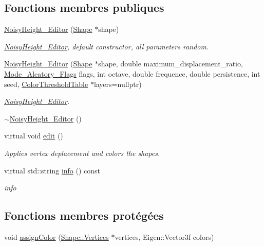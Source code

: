 \subsection*{Fonctions membres publiques}
\begin{DoxyCompactItemize}
\item 
\hyperlink{class_noisy_height___editor_ae4535fb17b29bd29d09dcadd5b9384e3}{Noisy\+Height\+\_\+\+Editor} (\hyperlink{class_shape}{Shape} $\ast$shape)
\begin{DoxyCompactList}\small\item\em \hyperlink{class_noisy_height___editor}{Noisy\+Height\+\_\+\+Editor}, default constructor, all parameters random. \end{DoxyCompactList}\item 
\hyperlink{class_noisy_height___editor_ac56426a50e5adf94c8b2a4211d0b0c77}{Noisy\+Height\+\_\+\+Editor} (\hyperlink{class_shape}{Shape} $\ast$shape, double maximum\+\_\+displacement\+\_\+ratio, \hyperlink{aleatorymode_8h_a8dc9582d5186e7d1ba17c0f21779d3d6}{Mode\+\_\+\+Aleatory\+\_\+\+Flags} flags, int octave, double frequence, double persistence, int seed, \hyperlink{thresholdtable_8h_ab0deb49d07758f9814993774cb9935cc}{Color\+Threshold\+Table} $\ast$layers=nullptr)
\begin{DoxyCompactList}\small\item\em \hyperlink{class_noisy_height___editor}{Noisy\+Height\+\_\+\+Editor}. \end{DoxyCompactList}\item 
\hyperlink{class_noisy_height___editor_afd295143a12d4d63773f69c1b5d1318b}{$\sim$\+Noisy\+Height\+\_\+\+Editor} ()
\item 
virtual void \hyperlink{class_noisy_height___editor_a3ed5c7267dec56ff2f21366ce2ae9818}{edit} ()
\begin{DoxyCompactList}\small\item\em Applies vertex deplacement and colors the shapes. \end{DoxyCompactList}\item 
virtual std\+::string \hyperlink{class_noisy_height___editor_a4749fe8cb3306252a8f48c8147854578}{info} () const
\begin{DoxyCompactList}\small\item\em info \end{DoxyCompactList}\end{DoxyCompactItemize}
\subsection*{Fonctions membres protégées}
\begin{DoxyCompactItemize}
\item 
void \hyperlink{class_noisy_height___editor_a4cb46efb3183c7558f450368b962d3fc}{assign\+Color} (\hyperlink{struct_shape_1_1_vertices}{Shape\+::\+Vertices} $\ast$vertices, Eigen\+::\+Vector3f colors)
\end{DoxyCompactItemize}
